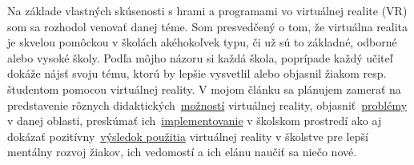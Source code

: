 Na základe vlastných skúsenosti s hrami a programami vo virtuálnej realite (VR) 
som sa rozhodol venovať danej téme. Som presvedčený 
o tom, že virtuálna realita je skvelou pomôckou v školách akéhokoľvek typu, 
či už sú to základné, odborné alebo vysoké školy. Podľa môjho názoru si každá 
škola, poprípade každý učiteľ dokáže nájsť svoju tému, ktorú by lepšie vysvetlil 
alebo objasnil žiakom resp. študentom  pomocou virtuálnej reality. V mojom článku 
sa plánujem zamerať na predstavenie rôznych
didaktických~\hyperref[riesenia]{možností}
virtuálnej reality, objasniť~\hyperref[objasnenie]{problémy} v danej oblasti, preskúmať ich~\hyperref[diskusia]{implementovanie} v školskom prostredí
ako aj dokázať pozitívny~\hyperref[zhodnotenie]{výsledok použitia} 
virtuálnej reality v školstve pre lepší mentálny rozvoj žiakov,
ich vedomostí a ich elánu naučiť sa niečo nové.